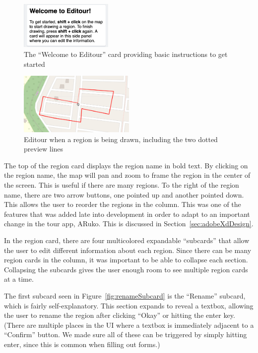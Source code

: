 \documentclass[a4paper, 10pt, american, titlepage]{article}
\begin{document}
\begin{figure}[h]
	\centering
	\includegraphics[width=0.4\textwidth]{welcome-card-editour.png}
    \caption{The ``Welcome to Editour'' card providing basic instructions to
    get started}
	\label{fig:welcomeCard}
\end{figure}

\begin{figure}[h]
	\centering
	\includegraphics[width=0.5\textwidth]{drawing-region-editour.png}
	\caption{Editour when a region is being drawn, including the two dotted
		preview lines}
	\label{fig:drawingRegion}
\end{figure}

The top of the region card displays the region name in bold text. By clicking
on the region name, the map will pan and zoom to frame the region in the center
of the screen. This is useful if there are many regions. To the right of the
region name, there are two arrow buttons, one pointed up and another pointed
down. This allows the user to reorder the regions in the column. This was one
of the features that was added late into development in order to adapt to an
important change in the tour app, ARuko. This is discussed in
Section~\ref{sec:adobeXdDesign}.

In the region card, there are four multicolored expandable ``subcards'' that
allow the user to edit different information about each region. Since there can
be many region cards in the column, it was important to be able to collapse
each section. Collapsing the subcards gives the user enough room to see
multiple region cards at a time.

The first subcard seen in Figure~\ref{fig:renameSubcard} is the ``Rename''
subcard, which is fairly self-explanatory.  This section expands to reveal a
textbox, allowing the user to rename the region after clicking ``Okay'' or
hitting the enter key. (There are multiple places in the UI where a textbox is
immediately adjacent to a ``Confirm'' button.  We made sure all of these can be
triggered by simply hitting enter, since this is common when filling out
forms.)
\end{document}
